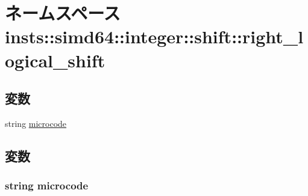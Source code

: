 \hypertarget{namespaceinsts_1_1simd64_1_1integer_1_1shift_1_1right__logical__shift}{
\section{ネームスペース insts::simd64::integer::shift::right\_\-logical\_\-shift}
\label{namespaceinsts_1_1simd64_1_1integer_1_1shift_1_1right__logical__shift}
}
\subsection*{変数}
\begin{DoxyCompactItemize}
\item 
string \hyperlink{namespaceinsts_1_1simd64_1_1integer_1_1shift_1_1right__logical__shift_a770f11a173e99389a8802f0107ed8f52}{microcode}
\end{DoxyCompactItemize}


\subsection{変数}
\hypertarget{namespaceinsts_1_1simd64_1_1integer_1_1shift_1_1right__logical__shift_a770f11a173e99389a8802f0107ed8f52}{
\subsubsection[{microcode}]{\setlength{\rightskip}{0pt plus 5cm}string {\bf microcode}}}
\label{namespaceinsts_1_1simd64_1_1integer_1_1shift_1_1right__logical__shift_a770f11a173e99389a8802f0107ed8f52}
